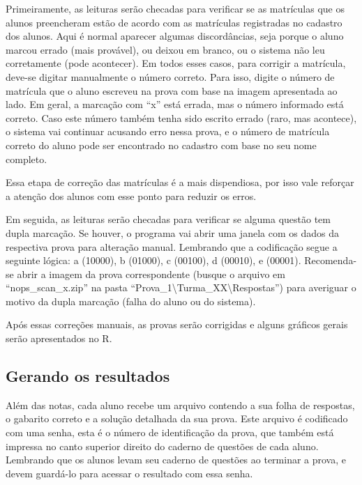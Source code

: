 \documentclass[a4paper]{report}
\begin{document}
Primeiramente, as leituras serão checadas para verificar se as
matrículas que os alunos preencheram estão de acordo com as matrículas
registradas no cadastro dos alunos. Aqui é normal aparecer algumas
discordâncias, seja porque o aluno marcou errado (mais provável), ou
deixou em branco, ou o sistema não leu corretamente (pode acontecer). Em
todos esses casos, para corrigir a matrícula, deve-se digitar
manualmente o número correto. Para isso, digite o número de matrícula
que o aluno escreveu na prova com base na imagem apresentada ao lado. Em
geral, a marcação com ``x'' está errada, mas o número informado está
correto. Caso este número também tenha sido escrito errado (raro, mas
acontece), o sistema vai continuar acusando erro nessa prova, e o número
de matrícula correto do aluno pode ser encontrado no cadastro com base
no seu nome completo.

Essa etapa de correção das matrículas é a mais dispendiosa, por isso
vale reforçar a atenção dos alunos com esse ponto para reduzir os erros.

Em seguida, as leituras serão checadas para verificar se alguma questão
tem dupla marcação. Se houver, o programa vai abrir uma janela com os
dados da respectiva prova para alteração manual. Lembrando que a
codificação segue a seguinte lógica: a (10000), b (01000), c (00100), d
(00010), e (00001). Recomenda-se abrir a imagem da prova correspondente
(busque o arquivo em ``nops\_scan\_x.zip'' na pasta
``Prova\_1\textbackslash{}Turma\_XX\textbackslash{}Respostas'') para
averiguar o motivo da dupla marcação (falha do aluno ou do sistema).

Após essas correções manuais, as provas serão corrigidas e alguns
gráficos gerais serão apresentados no R.

\subsection{Gerando os resultados}

Além das notas, cada aluno recebe um arquivo contendo a sua folha de
respostas, o gabarito correto e a solução detalhada da sua prova. Este
arquivo é codificado com uma senha, esta é o número de identificação da
prova, que também está impressa no canto superior direito do caderno de
questões de cada aluno. Lembrando que os alunos levam seu caderno de
questões ao terminar a prova, e devem guardá-lo para acessar o resultado
com essa senha.
\end{document}
